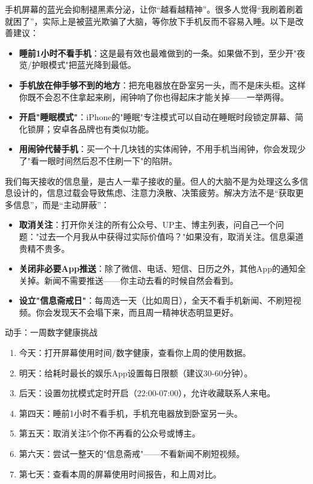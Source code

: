 
手机屏幕的蓝光会抑制褪黑素分泌，让你“越看越精神”。很多人觉得“我刷着刷着就困了”，实际上是被蓝光欺骗了大脑，等你放下手机反而不容易入睡。以下是改善建议：

\begin{itemize}
  \item \textbf{睡前1小时不看手机}：这是最有效也最难做到的一条。如果做不到，至少开"夜览/护眼模式"把蓝光降到最低。
  \item \textbf{手机放在伸手够不到的地方}：把充电器放在卧室另一头，而不是床头柜。这样你既不会忍不住拿起来刷，闹钟响了你也得起床才能关掉——一举两得。
  \item \textbf{开启"睡眠模式"}：iPhone的"睡眠"专注模式可以自动在睡眠时段锁定屏幕、简化锁屏；安卓各品牌也有类似功能。
  \item \textbf{用闹钟代替手机}：买一个十几块钱的实体闹钟，不用手机当闹钟，你会发现少了"看一眼时间然后忍不住刷一下"的陷阱。
\end{itemize}


我们每天接收的信息量，是古人一辈子接收的量。但人的大脑不是为处理这么多信息设计的，信息过载会导致焦虑、注意力涣散、决策疲劳。解决方法不是“获取更多信息”，而是“主动屏蔽”：

\begin{itemize}
  \item \textbf{取消关注}：打开你关注的所有公众号、UP主、博主列表，问自己一个问题："过去一个月我从中获得过实际价值吗？"如果没有，取消关注。信息渠道贵精不贵多。
  \item \textbf{关闭非必要App推送}：除了微信、电话、短信、日历之外，其他App的通知全关掉。新闻不需要推送——你主动去看的时候自然会看到。
  \item \textbf{设立"信息斋戒日"}：每周选一天（比如周日），全天不看手机新闻、不刷短视频。你会发现天不会塌下来，而且周一精神状态明显更好。
\end{itemize}

\begin{tcbpractice}{动手：一周数字健康挑战}
\begin{enumerate}
  \item 今天：打开屏幕使用时间/数字健康，查看你上周的使用数据。
  \item 明天：给耗时最长的娱乐App设置每日限额（建议30-60分钟）。
  \item 后天：设置勿扰模式定时开启（22:00-07:00），允许收藏联系人来电。
  \item 第四天：睡前1小时不看手机，手机充电器放到卧室另一头。
  \item 第五天：取消关注5个你不再看的公众号或博主。
  \item 第六天：尝试一整天的"信息斋戒"——不看新闻不刷短视频。
  \item 第七天：查看本周的屏幕使用时间报告，和上周对比。
\end{enumerate}

\end{tcbpractice}

